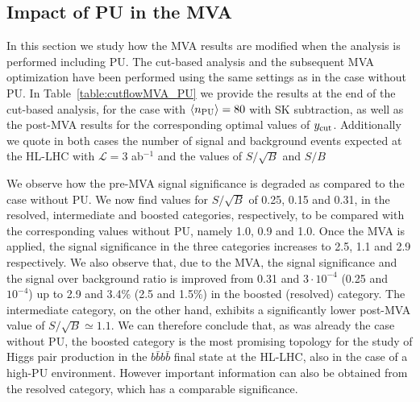 \subsection{Impact of PU in the MVA}

In this section we study how the MVA results are modified
when the analysis is performed including PU.
%
The cut-based analysis and the subsequent
MVA optimization have been performed using the same
settings as in the case without PU.
%
In Table~\ref{table:cutflowMVA_PU} we provide the results
  at the end of the cut-based analysis,
  for the case with $\left\langle n_{\rm PU}\right\rangle=80$ with SK
  subtraction,
  as well as the post-MVA results for the
  corresponding optimal values of $y_{\rm cut}$.
  Additionally we quote in
  both cases the number of signal and
    background events expected
    at the HL-LHC with $\mathcal{L}=3$ ab$^{-1}$
    and the values of $S/\sqrt{B}$ and $S/B$

  
We observe how the pre-MVA 
signal significance is degraded
as compared to the case without PU.
%
We now find values for $S/\sqrt{B}$ of 0.25, 0.15 and 0.31, in the resolved,
intermediate and boosted categories, respectively, to be compared
with the corresponding values without PU, namely 1.0, 0.9 and 1.0.
%
Once the MVA is applied, the signal significance in the three
categories increases to 2.5, 1.1 and 2.9 respectively.
%
We also observe that, due
to the MVA, the signal significance and the
signal over background ratio is improved from 0.31 and $3\cdot 10^{-4}$
(0.25 and $10^{-4}$) up to 2.9 and 3.4\% (2.5 and 1.5\%)
in the boosted (resolved) category.
%
The intermediate category, on the other hand, exhibits a
significantly lower post-MVA value of $S/\sqrt{B}\simeq
1.1$.
%
We can therefore conclude that, as was already the case
without PU,
the boosted category is the most promising
topology for the study of Higgs pair production in the $b\bar{b}b\bar{b}$
final state
at the HL-LHC, also in the case of a high-PU environment.
However important information can also be obtained from
the resolved category, which has a comparable significance.


